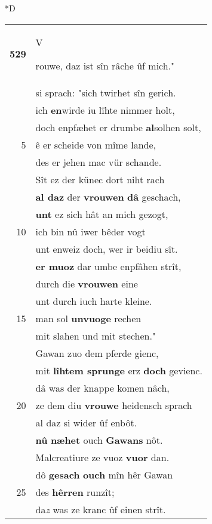 \documentclass[8pt,a4paper,notitlepage]{article}
\begin{document}
\begin{table}[ht]
\begin{minipage}[t]{0.5\linewidth}
\small
\begin{center}*D
\end{center}
\begin{tabular}{rl}
\textbf{529} & \begin{large}V\end{large}rouwe, daz ist sîn râche ûf mich."\\ 
 & si sprach: "sich twirhet sîn gerich.\\ 
 & ich \textbf{en}wirde iu lîhte nimmer holt,\\ 
 & doch enpfæhet er drumbe \textbf{al}solhen solt,\\ 
5 & ê er scheide von mîme lande,\\ 
 & des er jehen mac vür schande.\\ 
 & Sît ez der künec dort niht rach\\ 
 & \textbf{al daz} der \textbf{vrouwen} \textbf{dâ} geschach,\\ 
 & \textbf{unt} ez sich hât an mich gezogt,\\ 
10 & ich bin nû iwer bêder vogt\\ 
 & unt enweiz doch, wer ir beidiu sît.\\ 
 & \textbf{er muoz} dar umbe enpfâhen strît,\\ 
 & durch die \textbf{vrouwen} eine\\ 
 & unt durch iuch harte kleine.\\ 
15 & man sol \textbf{unvuoge} rechen\\ 
 & mit slahen und mit stechen."\\ 
 & Gawan zuo dem pferde gienc,\\ 
 & mit \textbf{lîhtem sprunge} erz \textbf{doch} gevienc.\\ 
 & dâ was der knappe komen nâch,\\ 
20 & ze dem diu \textbf{vrouwe} heidensch sprach\\ 
 & al daz si wider ûf enbôt.\\ 
 & \textbf{nû} \textbf{næhet} ouch \textbf{Gawans} nôt.\\ 
 & Malcreatiure ze vuoz \textbf{vuor} dan.\\ 
 & dô \textbf{gesach} \textbf{ouch} mîn hêr Gawan\\ 
25 & des \textbf{hêrren} runzît;\\ 
 & da\textit{z} was ze kranc ûf einen strît.\\ 

\end{tabular}
\end{minipage}
\end{table}
\end{document}
